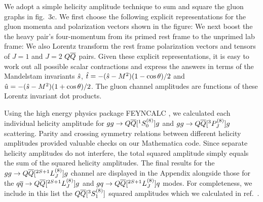 	We adopt a simple helicity amplitude technique to sum and square the 
gluon graphs in fig.~3c.  We first choose the following explicit 
representations for the gluon momenta and polarization vectors shown in the 
figure:
%
\eqn{}
%
We next boost the the heavy pair's four-momentum from its primed rest frame 
to the unprimed lab frame:
%
\eqn{}
%
We also Lorentz transform the rest frame polarization vectors and tensors 
%
\eqn{}
%
of $J=1$ and $J=2$ ${Q{\overline Q}}$ pairs.  Given these explicit representations, it 
is easy to work out all possible scalar contractions and express the answers 
in terms of the Mandelstam invariants $\hat{s}$, 
$\hat{t} = -(\hat{s}-M^2)(1-\cos\theta)/2$ and 
$\hat{u} = -(\hat{s}-M^2)(1+\cos\theta)/2$.  The gluon channel amplitudes are 
functions of these Lorentz invariant dot products.

	Using the high energy physics package FEYNCALC \Mertig, we calculated 
each individual helicity amplitude for $gg \to Q{\overline Q}[ ^1S_0^{(8)}] g$ and 
$gg \to Q{\overline Q}[ ^3P_J^{(8)}] g$ scattering.  Parity and crossing symmetry relations 
between different helicity amplitudes provided valuable checks on our 
Mathematica code.  Since separate helicity amplitudes do not interfere, the 
total squared amplitude simply equals the sum of the squared helicity 
amplitudes.  The final results for the $gg \to Q{\overline Q}[ ^{2S+1}L_J^{(8)}] g$ channel are 
displayed in the Appendix alongside those for the $q{\overline q} \to Q{\overline Q}[ ^{2S+1}L_J^{(8)}] g$ 
and $g q \to Q{\overline Q}[ ^{2S+1}L_J^{(8)}] q$ modes.  For completeness, we include in this 
list the $Q{\overline Q}[ ^3S_1^{(8)}]$ squared amplitudes which we calculated in 
ref.~\ChoLeibov.

